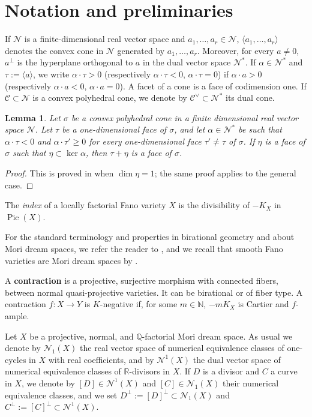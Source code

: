 \documentclass[a4paper,12pt]{amsart}
\newtheorem{lemma}[thm]{Lemma}
\theoremstyle{definition}
\numberwithin{figure}{section}
\numberwithin{table}{section}
\newcommand{\ma}{\mathcal}
\newcommand{\Q}{\mathbb{Q}}
\newcommand{\R}{\mathbb{R}}
\newcommand{\N}{\mathcal{N}_1}
\newcommand{\Nu}{\mathcal{N}^1}
\newcommand{\Pic}{\operatorname{Pic}}
\begin{document}
    \section{Notation and preliminaries}\label{notation}
    \noindent If $\mathcal{N}$ is a finite-dimensional real vector space and $a_1,\dotsc,a_r\in \mathcal{N}$, $\langle a_1,\dotsc,a_r\rangle$ denotes the convex cone in $\mathcal{N}$ generated by $a_1,\dotsc,a_r$.
    Moreover, for every $a\neq 0$, $a^{\perp}$ is the hyperplane orthogonal to $a$ in the dual vector space $\ma{N}^*$.
    If $\alpha\in\ma{N}^*$ and $\tau:=\langle a\rangle$, we write $\alpha\cdot\tau >0$ (respectively $\alpha\cdot\tau <0$,  $\alpha\cdot\tau =0$) if
     $\alpha\cdot a>0$  (respectively $\alpha\cdot a<0$,  $\alpha\cdot a=0$).
    A facet of a cone is a face of codimension one. If $\ma{C}\subset\ma{N}$ is a convex polyhedral cone, we denote by $\ma{C}^{\vee}\subset\ma{N}^*$ its dual cone.
     \begin{lemma}\label{cones}
Let $\sigma$ be a convex polyhedral cone in a finite dimensional real vector
space $\ma{N}$. Let $\tau$ be a one-dimensional face of $\sigma$, and let $\alpha\in\ma{N}^*$ be such that
$\alpha\cdot\tau<0$ and $\alpha\cdot\tau'\geq 0$ for every one-dimensional face $\tau'\neq\tau$ of $\sigma$.
If $\eta$ is a face of $\sigma$ such that $\eta\subset \ker\alpha$, then $\tau+\eta$ is a face of $\sigma$.
\end{lemma}
\begin{proof}
This is proved in \cite[Lemma 4.7]{fibrations} when $\dim\eta=1$; the same proof applies to the general case.
  \end{proof}

\medskip

The \emph{index} of a locally factorial Fano variety $X$ is the divisibility of $-K_X$ in $\Pic(X)$.

  For the standard terminology and properties in birational geometry and about Mori dream spaces, we refer the reader to \cite{KollarMori,hukeel}, and we recall that smooth Fano varieties are Mori dream spaces by \cite[Cor.~1.3.2]{BCHM}.

 A {\bf contraction} is a projective, surjective morphism with connected fibers, between normal quasi-projective varieties. It can be birational or of fiber type. A contraction $f\colon X\to Y$ is $K$-negative if, for some $m\in\mathbb{N}$,
 $-mK_X$ is Cartier and $f$-ample.
 
 \medskip
 
  Let $X$ be a projective, normal, and $\Q$-factorial Mori dream space.
    As usual we denote by $\N(X)$ the real vector space of numerical equivalence classes of one-cycles in $X$ with real coefficients, and by $\Nu(X)$ the dual vector space of numerical equivalence classes of $\R$-divisors in $X$.
If $D$ is a divisor and $C$ a curve in $X$, we denote by $[D]\in\Nu(X)$ and $[C]\in\N(X)$ their numerical equivalence classes, and we  set $D^{\perp}:=[D]^{\perp}\subset\N(X)$ and $C^{\perp}:=[C]^{\perp}\subset\Nu(X)$.
\end{document}
